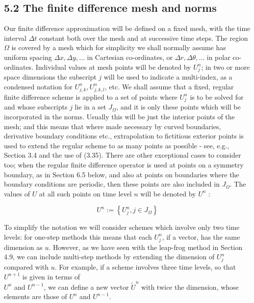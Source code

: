 \documentclass[10pt]{article}
\begin{document}
\subsection*{5.2 The finite difference mesh and norms}
Our finite difference approximation will be defined on a fixed mesh, with the time interval \(\Delta t\) constant both over the mesh and at successive time steps. The region \(\Omega\) is covered by a mesh which for simplicity we shall normally assume has uniform spacing \(\Delta x, \Delta y, \ldots\) in Cartesian co-ordinates, or \(\Delta r, \Delta \theta, \ldots\) in polar co-ordinates. Individual values at mesh points will be denoted by \(U_{j}^{n}\); in two or more space dimensions the subscript \(j\) will be used to indicate a multi-index, as a condensed notation for \(U_{j, k}^{n}, U_{j, k, l}^{n}\), etc. We shall assume that a fixed, regular finite difference scheme is applied to a set of points where \(U_{j}^{n}\) is to be solved for and whose subscripts \(j\) lie in a set \(J_{\Omega}\), and it is only these points which will be incorporated in the norms. Usually this will be just the interior points of the mesh; and this means that where made necessary by curved boundaries, derivative boundary conditions etc., extrapolation to fictitious exterior points is used to extend the regular scheme to as many points as possible - see, e.g., Section 3.4 and the use of (3.35). There are other exceptional cases to consider too; when the regular finite difference operator is used at points on a symmetry boundary, as in Section 6.5 below, and also at points on boundaries where the boundary conditions are periodic, then these points are also included in \(J_{\Omega}\). The values of \(U\) at all such points on time level \(n\) will be denoted by \(U^{n}\) :

\[
U^{n}:=\left\{U_{j}^{n}, j \in J_{\Omega}\right\}
\]

To simplify the notation we will consider schemes which involve only two time levels: for one-step methods this means that each \(U_{j}^{n}\), if a vector, has the same dimension as \(u\). However, as we have seen with the leap-frog method in Section 4.9, we can include multi-step methods by extending the dimension of \(U_{j}^{n}\) compared with \(u\). For example, if a scheme involves three time levels, so that \(U^{n+1}\) is given in terms of\\
\(U^{n}\) and \(U^{n-1}\), we can define a new vector \(\tilde{U}^{n}\) with twice the dimension, whose elements are those of \(U^{n}\) and \(U^{n-1}\).
\end{document}
